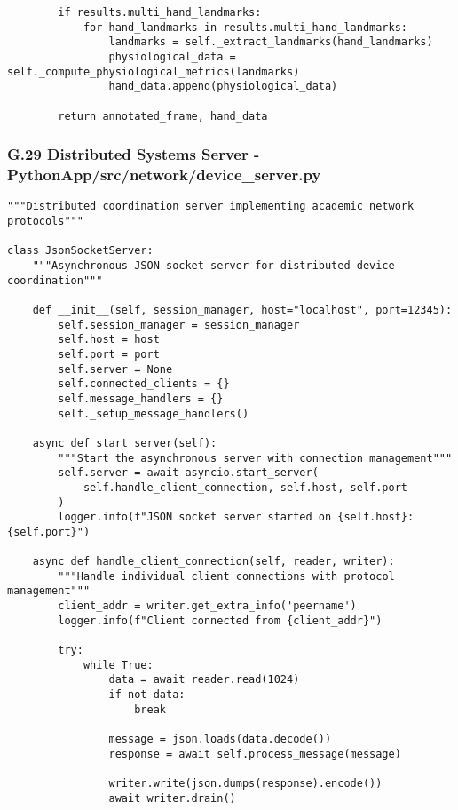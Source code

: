 \documentclass[12pt,a4paper]{article}
\begin{document}
{{\begin{verbatim}
        if results.multi_hand_landmarks:
            for hand_landmarks in results.multi_hand_landmarks:
                landmarks = self._extract_landmarks(hand_landmarks)
                physiological_data = self._compute_physiological_metrics(landmarks)
                hand_data.append(physiological_data)
                
        return annotated_frame, hand_data
\end{verbatim}

\subsubsection{G.29 Distributed Systems Server - PythonApp/src/network/device_server.py}

\begin{verbatim}
"""Distributed coordination server implementing academic network protocols"""

class JsonSocketServer:
    """Asynchronous JSON socket server for distributed device coordination"""
    
    def __init__(self, session_manager, host="localhost", port=12345):
        self.session_manager = session_manager
        self.host = host
        self.port = port
        self.server = None
        self.connected_clients = {}
        self.message_handlers = {}
        self._setup_message_handlers()
    
    async def start_server(self):
        """Start the asynchronous server with connection management"""
        self.server = await asyncio.start_server(
            self.handle_client_connection, self.host, self.port
        )
        logger.info(f"JSON socket server started on {self.host}:{self.port}")
    
    async def handle_client_connection(self, reader, writer):
        """Handle individual client connections with protocol management"""
        client_addr = writer.get_extra_info('peername')
        logger.info(f"Client connected from {client_addr}")
        
        try:
            while True:
                data = await reader.read(1024)
                if not data:
                    break
                    
                message = json.loads(data.decode())
                response = await self.process_message(message)
                
                writer.write(json.dumps(response).encode())
                await writer.drain()
                

\end{verbatim}}}
\end{document}
